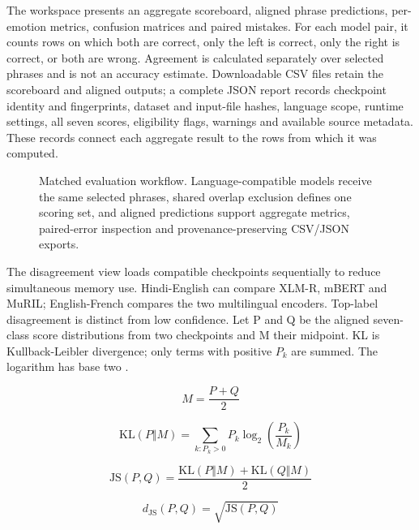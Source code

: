 \documentclass[journal]{IEEEtran}
\begin{document}
The workspace presents an aggregate scoreboard, aligned phrase predictions, per-emotion metrics, confusion matrices and paired mistakes. For each model pair, it counts rows on which both are correct, only the left is correct, only the right is correct, or both are wrong. Agreement is calculated separately over selected phrases and is not an accuracy estimate. Downloadable CSV files retain the scoreboard and aligned outputs; a complete JSON report records checkpoint identity and fingerprints, dataset and input-file hashes, language scope, runtime settings, all seven scores, eligibility flags, warnings and available source metadata. These records connect each aggregate result to the rows from which it was computed.

\begin{figure}[!t]
\centering
\resizebox{.94\textwidth}{!}{}
\caption{Matched evaluation workflow. Language-compatible models receive the same selected phrases, shared overlap exclusion defines one scoring set, and aligned predictions support aggregate metrics, paired-error inspection and provenance-preserving CSV/JSON exports.}\label{fig:matched_evaluation}
\end{figure}


The disagreement view loads compatible checkpoints sequentially to reduce simultaneous memory use. Hindi-English can compare XLM-R, mBERT and MuRIL; English-French compares the two multilingual encoders. Top-label disagreement is distinct from low confidence. Let P and Q be the aligned seven-class score distributions from two checkpoints and M their midpoint. KL is Kullback-Leibler divergence; only terms with positive \(P_k\) are summed. The logarithm has base two \cite{lin1991}.

\begin{equation}
M=\frac{P+Q}{2}
\label{eq:js_mixture}
\end{equation}

\begin{equation}
\mathrm{KL}(P\Vert M)=\sum_{k:P_k>0}P_k\log_2\!\left(\frac{P_k}{M_k}\right)
\label{eq:kl}
\end{equation}

\begin{equation}
\mathrm{JS}(P,Q)=\frac{\mathrm{KL}(P\Vert M)+\mathrm{KL}(Q\Vert M)}{2}
\label{eq:js}
\end{equation}

\begin{equation}
d_{\mathrm{JS}}(P,Q)=\sqrt{\mathrm{JS}(P,Q)}
\label{eq:js_distance}
\end{equation}
\end{document}
